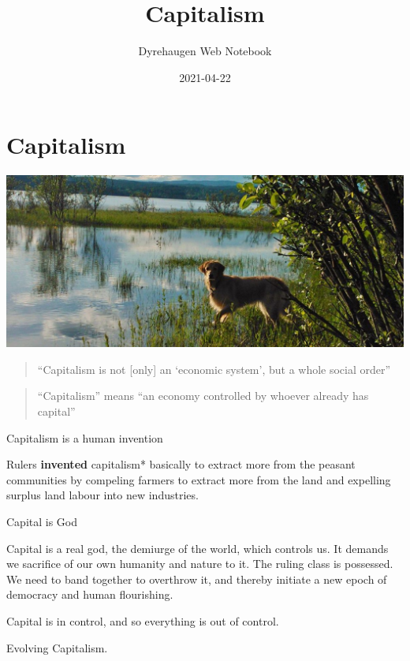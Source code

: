 \documentclass[
]{book}
\title{Capitalism}
\author{Dyrehaugen Web Notebook}
\date{2021-04-22}
\begin{document}
\maketitle

{
\setcounter{tocdepth}{1}
\tableofcontents
}
\hypertarget{capitalism}{%
\chapter{Capitalism}\label{capitalism}}

\includegraphics{fig/zelda.jpg}

\begin{quote}
``Capitalism is not {[}only{]} an `economic system', but a whole social order''
\end{quote}

\begin{quote}
``Capitalism'' means ``an economy controlled by whoever already has capital''
\end{quote}

Capitalism is a human invention

Rulers \textbf{invented} capitalism* basically to
extract more from the peasant communities by compeling farmers to extract more from the land
and expelling surplus land labour into new industries.

Capital is God

Capital is a real god, the demiurge of the world, which controls us. It demands we sacrifice of our own humanity and nature to it. The ruling class is possessed. We need to band together to overthrow it, and thereby initiate a new epoch of democracy and human flourishing.

Capital is in control, and so everything is out of control.

Evolving Capitalism.
\end{document}
